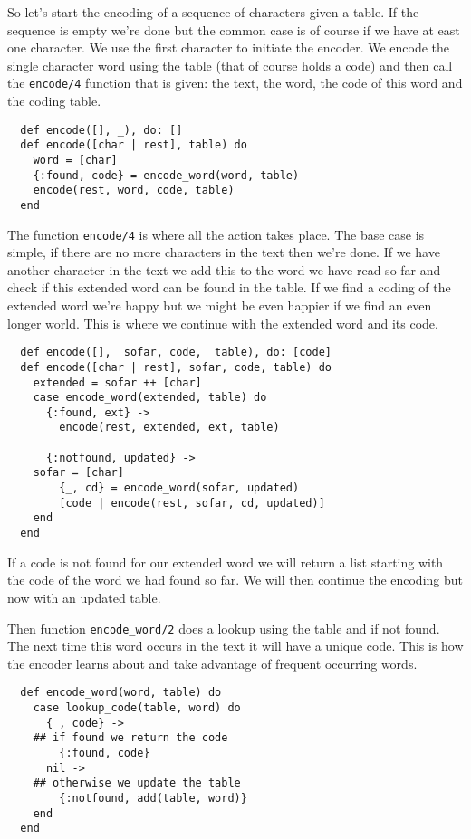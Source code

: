 \documentclass[a4paper,11pt]{article}
\begin{document}
So let's start the encoding of a sequence of characters given a
table. If the sequence is empty we're done but the common case is of
course if we have at east one character. We use the first character to
initiate the encoder. We encode the single character word using the
table (that of course holds a code) and then call the {\tt encode/4}
function that is given: the text, the word, the code of this word and
the coding table.

\begin{verbatim}
  def encode([], _), do: []
  def encode([char | rest], table) do
    word = [char]
    {:found, code} = encode_word(word, table)
    encode(rest, word, code, table)
  end
\end{verbatim}

The function {\tt encode/4} is where all the action takes place. The
base case is simple, if there are no more characters in the text then
we're done. If we have another character in the text we add this to the
word we have read so-far and check if this extended word can be found
in the table. If we find a coding of the extended word we're happy but we
might be even happier if we find an even longer world. This is
where we continue with the extended word and its code.

\begin{verbatim}
  def encode([], _sofar, code, _table), do: [code]
  def encode([char | rest], sofar, code, table) do
    extended = sofar ++ [char]
    case encode_word(extended, table) do
      {:found, ext} ->
        encode(rest, extended, ext, table)

      {:notfound, updated} ->
	sofar = [char]
        {_, cd} = encode_word(sofar, updated)
        [code | encode(rest, sofar, cd, updated)]
    end
  end
\end{verbatim}

If a code is not found for our extended word we will return a list
starting with the code of the word we had found so far. We will then
continue the encoding but now with an updated table. 

Then function {\tt encode\_word/2} does a lookup using the table and if
not found. The next time this word occurs in the text it will have a
unique code. This is how the encoder learns about and take advantage
of frequent occurring words.

\begin{verbatim}
  def encode_word(word, table) do
    case lookup_code(table, word) do
      {_, code} ->
	## if found we return the code
        {:found, code}
      nil ->
	## otherwise we update the table
        {:notfound, add(table, word)}
    end
  end
\end{verbatim}
\end{document}

